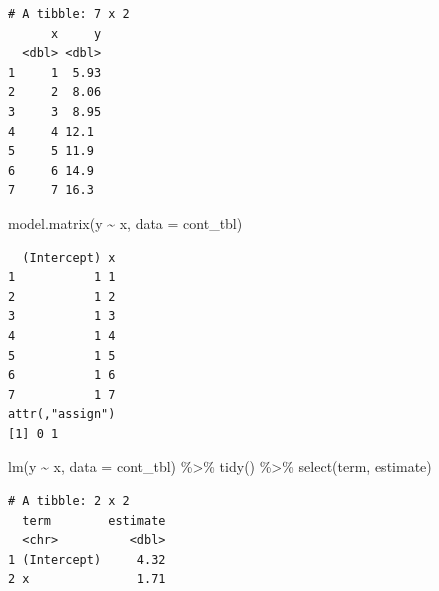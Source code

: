 \documentclass[
  letterpaper,
]{scrbook}
\newenvironment{Shaded}{\begin{snugshade}}{\end{snugshade}}
\newcommand{\AttributeTok}[1]{\textcolor[rgb]{0.40,0.45,0.13}{#1}}
\newcommand{\FunctionTok}[1]{\textcolor[rgb]{0.28,0.35,0.67}{#1}}
\newcommand{\NormalTok}[1]{\textcolor[rgb]{0.00,0.23,0.31}{#1}}
\newcommand{\SpecialCharTok}[1]{\textcolor[rgb]{0.37,0.37,0.37}{#1}}
\begin{document}
\begin{verbatim}
# A tibble: 7 x 2
      x     y
  <dbl> <dbl>
1     1  5.93
2     2  8.06
3     3  8.95
4     4 12.1 
5     5 11.9 
6     6 14.9 
7     7 16.3 
\end{verbatim}

\begin{Shaded}
\begin{Highlighting}[]
\FunctionTok{model.matrix}\NormalTok{(y }\SpecialCharTok{\textasciitilde{}}\NormalTok{ x, }\AttributeTok{data =}\NormalTok{ cont\_tbl)}
\end{Highlighting}
\end{Shaded}

\begin{verbatim}
  (Intercept) x
1           1 1
2           1 2
3           1 3
4           1 4
5           1 5
6           1 6
7           1 7
attr(,"assign")
[1] 0 1
\end{verbatim}

\begin{Shaded}
\begin{Highlighting}[]
\FunctionTok{lm}\NormalTok{(y }\SpecialCharTok{\textasciitilde{}}\NormalTok{ x, }\AttributeTok{data =}\NormalTok{ cont\_tbl) }\SpecialCharTok{\%\textgreater{}\%} 
  \FunctionTok{tidy}\NormalTok{() }\SpecialCharTok{\%\textgreater{}\%} 
  \FunctionTok{select}\NormalTok{(term, estimate)}
\end{Highlighting}
\end{Shaded}

\begin{verbatim}
# A tibble: 2 x 2
  term        estimate
  <chr>          <dbl>
1 (Intercept)     4.32
2 x               1.71
\end{verbatim}
\end{document}
